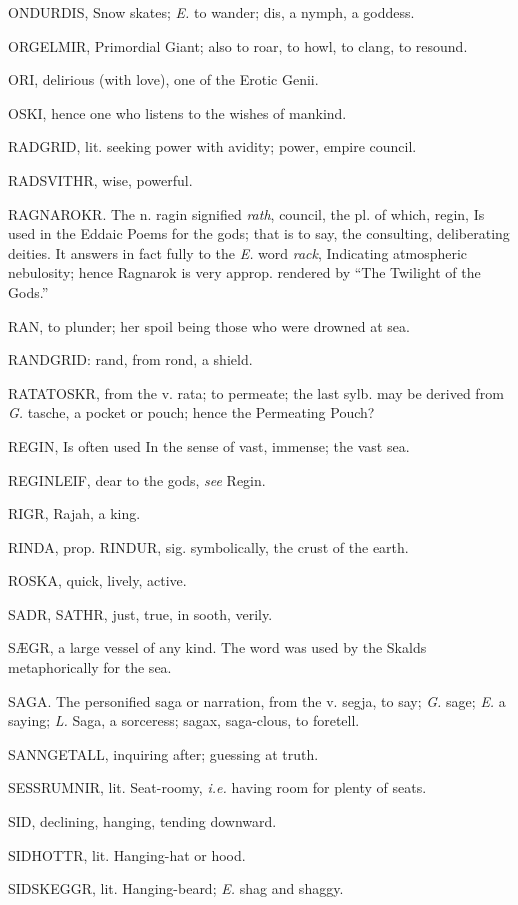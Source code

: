 ONDURDIS, Snow skates; \emph{E.} to wander; dis, a nymph, a goddess.

ORGELMIR, Primordial Giant; also to roar, to howl, to clang, to
resound.

ORI, delirious (with love), one of the Erotic Genii.

OSKI, hence one who listens to the wishes of mankind.

RADGRID, lit. seeking power with avidity; power, empire council.

RADSVITHR, wise, powerful.

RAGNAROKR. The n. ragin signified \emph{rath}, council, the pl. of which,
regin, Is used in the Eddaic Poems for the gods; that is to say, the
consulting, deliberating deities. It answers in fact fully to the \emph{E.}
word \emph{rack}, Indicating atmospheric nebulosity; hence Ragnarok is very
approp. rendered by ``The Twilight of the Gods.''

RAN, to plunder; her spoil being those who were drowned at sea.

RANDGRID: rand, from rond, a shield.

RATATOSKR, from the v. rata; to permeate; the last sylb. may be
derived from \emph{G.} tasche, a pocket or pouch; hence the Permeating
Pouch?

REGIN, Is often used In the sense of vast, immense; the vast sea.

REGINLEIF, dear to the gods, \emph{see} Regin.

RIGR, Rajah, a king.

RINDA, prop. RINDUR, sig. symbolically, the crust of the earth.

ROSKA, quick, lively, active.

SADR, SATHR, just, true, in sooth, verily.

SÆGR, a large vessel of any kind. The word was used by the Skalds
metaphorically for the sea.

SAGA. The personified saga or narration, from the v. segja, to say;
\emph{G.} sage; \emph{E.} a saying; \emph{L.} Saga, a sorceress; sagax, saga-clous,
to foretell.

SANNGETALL, inquiring after; guessing at truth.

SESSRUMNIR, lit. Seat-roomy, \emph{i.e.} having room for plenty of seats.

SID, declining, hanging, tending downward.

SIDHOTTR, lit. Hanging-hat or hood.

SIDSKEGGR, lit. Hanging-beard; \emph{E.} shag and shaggy.

